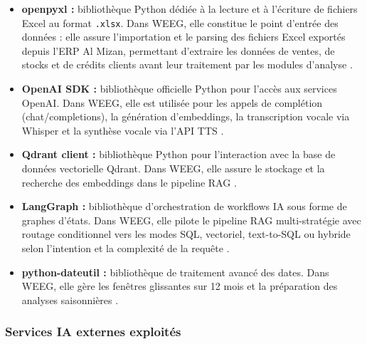 \documentclass[a4paper,12pt]{report}
\begin{document}
\begin{itemize}
    \item \textbf{openpyxl :} bibliothèque Python dédiée à la lecture et à
    l'écriture de fichiers Excel au format \texttt{.xlsx}. Dans WEEG, elle constitue
    le point d'entrée des données : elle assure l'importation et le parsing des
    fichiers Excel exportés depuis l'ERP Al Mizan, permettant d'extraire les données
    de ventes, de stocks et de crédits clients avant leur traitement par les modules
    d'analyse \cite{ref38}.

    \item \textbf{OpenAI SDK :} bibliothèque officielle Python pour l'accès aux
    services OpenAI. Dans WEEG, elle est utilisée pour les appels de complétion
    (chat/completions), la génération d'embeddings, la transcription vocale via
    Whisper et la synthèse vocale via l'API TTS \cite{A4}\cite{ref45}\cite{ref43}\cite{ref42}\cite{ref44}.

    \item \textbf{Qdrant client :} bibliothèque Python pour l'interaction avec la
    base de données vectorielle Qdrant. Dans WEEG, elle assure le stockage et la
    recherche des embeddings dans le pipeline RAG \cite{ref39}.

    \item \textbf{LangGraph :} bibliothèque d'orchestration de workflows IA sous
    forme de graphes d'états. Dans WEEG, elle pilote le pipeline RAG
    multi-stratégie avec routage conditionnel vers les modes SQL, vectoriel,
    text-to-SQL ou hybride selon l'intention et la complexité de la requête \cite{ref40}.

    \item \textbf{python-dateutil :} bibliothèque de traitement avancé des dates.
    Dans WEEG, elle gère les fenêtres glissantes sur 12 mois et la préparation
    des analyses saisonnières \cite{ref41}.
\end{itemize}

\subsubsection{Services IA externes exploités}
\end{document}
